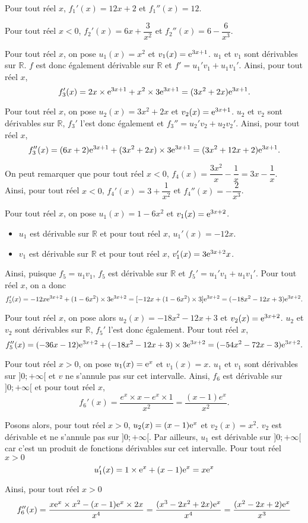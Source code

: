 \documentclass[11pt,fleqn]{book} %
\begin{document}
\begin{solution}Pour tout réel $x$, $f_1'(x)=12x+2$ et $f_1''(x)=12$.

Pour tout réel $x<0$, $f_2'(x)=6x+\dfrac{3}{x^2}$ et $f_2''(x)=6-\dfrac{6}{x^3}$.

Pour tout réel $x$, on pose $u_1(x)=x^2$ et $v_1(x)=\mathrm{e}^{3x+1}$. $u_1$ et $v_1$ sont dérivables sur $\mathbb{R}$. $f$ est donc également dérivable sur $\mathbb{R}$ et $f'=u_1'v_1+u_1v_1'$. Ainsi, pour tout réel $x$,
\[ f_3'(x)= 2x \times \mathrm{e}^{3x+1} + x^2 \times 3\mathrm{e}^{3x+1} = (3x^2+2x)\mathrm{e}^{3x+1}.\]

Pour tout réel $x$, on pose $u_2(x)=3x^2+2x$ et $v_2(x)=\mathrm{e}^{3x+1}$. $u_2$ et $v_2$ sont dérivables sur $\mathbb{R}$, $f_3'$ l'est donc également et $f_3''=u_2'v_2+u_2v_2'$. Ainsi, pour tout réel $x$,
\[f_3''(x)=(6x+2)\mathrm{e}^{3x+1}+(3x^2+2x)\times 3\mathrm{e}^{3x+1}=(3x^2+12x+2)\mathrm{e}^{3x+1}.\]

On peut remarquer que pour tout réel $x<0$, $f_4(x)=\dfrac{3x^2}{x}-\dfrac{1}{x}=3x-\dfrac{1}{x}$. \\Ainsi, pour tout réel $x<0$, $f_4'(x)=3+\dfrac{1}{x^2}$ et $f_4''(x)=-\dfrac{2}{x^3}$.

Pour tout réel $x$, on pose $u_1(x)=1-6x^2$ et $v_1(x)=\mathrm{e}^{3x+2}$.
\begin{itemize}
\item $u_1$ est dérivable sur $\mathbb{R}$ et pour tout réel $x$, $u_1'(x)=-12x$.
\item $v_1$ est dérivable sur $\mathbb{R}$ et pour tout réel $x$, $v_1'(x)=3\mathrm{e}^{3x+2}x$.
\end{itemize}
Ainsi, puisque $f_5=u_1v_1$, $f_5$ est dérivable sur $\mathbb{R}$ et $f_5'=u_1'v_1+u_1v_1'$. Pour tout réel $x$, on a donc
\[ f_5'(x)=-12x\mathrm{e}^{3x+2}+(1-6x^2)\times 3\mathrm{e}^{3x+2}=[-12x+(1-6x^2)\times 3] \mathrm{e}^{3x+2}=(-18x^2-12x+3)\mathrm{e}^{3x+2}.\]

Pour tout réel $x$, on pose alors $u_2(x)=-18x^2-12x+3$ et $v_2(x)=\mathrm{e}^{3x+2}$. $u_2$ et $v_2$ sont dérivables sur $\mathbb{R}$, $f_5'$ l'est donc également. Pour tout réel $x$,
\[ f_5''(x)= (-36x-12)\mathrm{e}^{3x+2} + (-18x^2-12x+3) \times 3\mathrm{e}^{3x+2}=(-54x^2-72x-3)\mathrm{e}^{3x+2}.\]

Pour tout réel $x>0$, on pose $u_1(x)=\mathrm{e}^x$ et $v_1(x)=x$. $u_1$ et $v_1$ sont dérivables sur $]0;+\infty[$ et $v$ ne s'annule pas sur cet intervalle. Ainsi, $f_6$ est dérivable sur $]0;+\infty[$ et pour tout réel $x$,
\[ f_6'(x)= \dfrac{e^x \times x - e^x \times 1}{x^2}=\dfrac{(x-1)e^x}{x^2}.\]

Posons alors, pour tout réel $x>0$, $u_2(x)=(x-1)\mathrm{e}^x$ et $v_2(x)=x^2$. $v_2$ est dérivable et ne s'annule pas sur $]0;+\infty[$. Par ailleurs, $u_1$ est dérivable sur $]0;+\infty[$ car c'est un produit de fonctions dérivables sur cet intervalle. Pour tout réel $x>0$
\[ u_1'(x)= 1 \times \mathrm{e}^x + (x-1)\mathrm{e}^x =x\mathrm{e}^x\]

Ainsi, pour tout réel $x>0$
\[ f_6''(x)=\dfrac{x\mathrm{e}^x \times x^2-(x-1)\mathrm{e}^x \times 2x}{x^4}=\dfrac{(x^3-2x^2+2x)\mathrm{e}^x}{x^4}=\dfrac{(x^2-2x+2)\mathrm{e}^x}{x^3}\]
\newpage
\end{solution}
\end{document}
